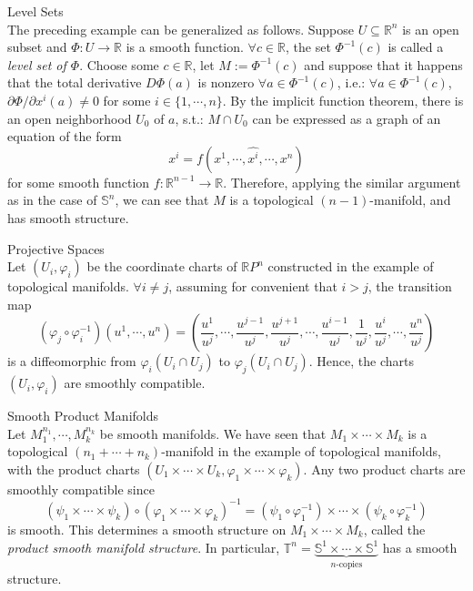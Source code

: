\begin{example}{Level Sets}\\
The preceding example can be generalized as follows. Suppose $U \subseteq \mathbb{R}^n$ is an open subset and $\Phi: U\to \mathbb{R}$ is a smooth function. $\forall c\in \mathbb{R}$, the set $\Phi^{-1} (c)$ is called a \textit{level set of $\Phi$}. Choose some $c\in \mathbb{R}$, let $M:= \Phi^{-1}(c)$ and suppose that it happens that the total derivative $D\Phi(a)$ is nonzero $\forall a\in \Phi^{-1}(c)$, i.e.: $\forall a\in \Phi^{-1} (c)$, $\partial \Phi/\partial x^i(a)\neq 0$ for some $i\in \{1,\cdots, n\}$. By the implicit function theorem, there is an open neighborhood $U_0$ of $a$, s.t.: $M\cap U_0$ can be expressed as a graph of an equation of the form
\[
x^i= f(x^1 ,\cdots, \widehat{x^i} ,\cdots, x^n)
\]
for some smooth function $f: \mathbb{R}^{n-1} \to \mathbb{R}$. Therefore, applying the similar argument as in the case of $\mathbb{S}^n$, we can see that $M$ is a topological $(n-1)$-manifold, and has smooth structure.
\end{example}

\begin{example}{Projective Spaces}\\
Let $(U_i, \varphi_i)$ be the coordinate charts of $\mathbb{R}P^n$ constructed in the example of topological manifolds. $\forall i\neq j$, assuming for convenient that $i>j$, the transition map
\[
(\varphi_j \circ \varphi_i^{-1}) (u^1 ,\cdots, u^n)= (\frac{u^1}{u^j} ,\cdots, \frac{u^{j-1}}{u^j} ,\frac{u^{j+1}}{u^j} ,\cdots, \frac{u^{i-1}}{u^j} ,\frac{1}{u^j}, \frac{u^i}{u^j} ,\cdots, \frac{u^n}{u^j})
\]
is a diffeomorphic from $\varphi_i(U_i \cap U_j)$ to $\varphi_j(U_i \cap U_j)$. Hence, the charts $(U_i ,\varphi_i)$ are smoothly compatible.
\end{example}

\begin{example}{Smooth Product Manifolds}\\
Let $M^{n_1}_1 ,\cdots, M_{k}^{n_k}$ be smooth manifolds. We have seen that $M_1 \times \cdots \times M_k$ is a topological $(n_1+\cdots +n_k)$-manifold in the example of topological manifolds, with the product charts $(U_1\times \cdots \times U_k ,\varphi_1 \times \cdots \times \varphi_k)$. Any two product charts are smoothly compatible since
\[
(\psi_1 \times \cdots \times \psi_k) \circ (\varphi_1 \times \cdots \times \varphi_k)^{-1} = (\psi_1 \circ \varphi_1^{-1}) \times \cdots \times (\psi_k \circ \varphi_k^{-1})
\]
is smooth. This determines a smooth structure on $M_1 \times \cdots \times M_k$, called the \textit{product smooth manifold structure}. In particular, $\mathbb{T}^n= \underbrace{\mathbb{S}^1 \times \cdots \times \mathbb{S}^1}_{n\text{-copies}}$ has a smooth structure.
\end{example}


